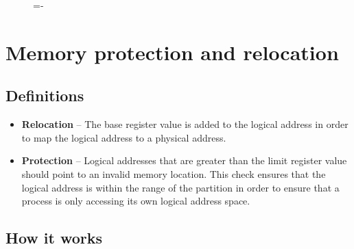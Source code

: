 \documentclass[a4paper]{systems-software}
\begin{document}
\begin{figure}[H]
  \lineskip=-\fboxrule
\end{figure}


\section*{Memory protection and relocation}

\subsection*{Definitions}

\begin{itemize}
	\item \textbf{Relocation} -- The base register value is added to the logical address in order to map the logical address to a physical address.
	\item \textbf{Protection} -- Logical addresses that are greater than the limit register value should point to an invalid memory location. This check ensures that the logical address is within the range of the partition in order to ensure that a process is only accessing its own logical address space.
\end{itemize}


\subsection*{How it works}
\end{document}
